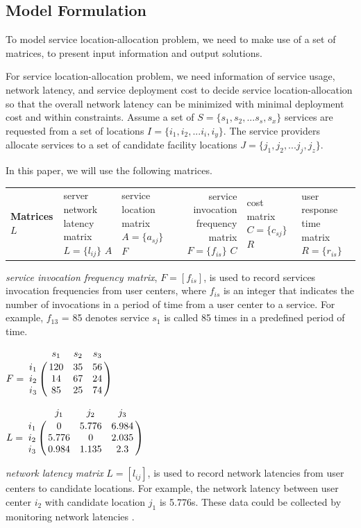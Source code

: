 \documentclass{llncs}
\let\bbordermatrix\bordermatrix
\begin{document}
\subsection{Model Formulation}
\label{sec:model}
To model service location-allocation problem, we need to make use of a set of matrices, to present input information and output solutions. 

For service location-allocation problem, we need information of service usage, network latency, and service deployment cost to decide service location-allocation so that the overall network latency can be minimized with minimal deployment cost and within constraints.
Assume a set of $S = \{ s_{1}, s_{2}, ...s_{s}, s_{x}\}$ services are
requested from a set of locations $I = \{ i_{1}, i_{2}, ...i_{i}, i_{y} \}$. 
The service providers allocate services to a set of candidate facility locations $J = \{ j_{1}, j_{2}, ...j_{j}, j_{z} \}$.


In this paper, we will use the following matrices.
\begin{center}
{
	\begin{tabular}{l*{2}{l}r}
		\hline
		\textbf{Matrices} \cr
		$L$ & server network latency matrix $L = \{l_{ij}\}$ \cr
		$A$ & service location matrix $A = \{a_{sj}\}$ \cr
		$F$ & service invocation frequency matrix $F = \{f_{is}\}$ \cr
		$C$ & cost matrix $C = \{c_{sj}\}$ \cr
		$R$ & user response time matrix $R = \{r_{is}\}$ \cr
		\hline
	\end{tabular}
}
\end{center}
\emph{service invocation frequency matrix}, $F= [f_{is}]$, is used to record services invocation frequencies from user centers, 
where $f_{is}$ is an integer that indicates the number of invocations in a period of time from a user center to a service. 
For example, $f_{13}$ = 85 denotes service $s_{1}$ is called 85 times in a predefined period of time.

\parbox{.45\linewidth}{
{\centering
$
F = \bbordermatrix{~ & s_{1} & s_{2} & s_{3}  \cr
					i_{1}	&120 &35 &56	\cr
					i_{2}	&14  &67 &24 \cr
					i_{3}	&85 &25 &74 \cr}
$
\\}
}
\parbox{.45\linewidth}{
{\centering
$
L = \bbordermatrix{~ & j_{1} & j_{2} & j_{3} \cr
					i_{1}	&0 &5.776 &6.984	\cr
					i_{2}	&5.776  &0 &2.035 \cr
					i_{3}	&0.984 &1.135	&2.3 \cr}
$
\\}
}

\emph{network latency matrix} $L = [l_{ij}]$, is used to record network latencies from user centers to 
candidate locations. For example, the network latency between user center $i_{2}$ with candidate location $j_{1}$ 
is 5.776s. These data could be collected by monitoring network latencies \cite{6076756} \cite{5552800}.
\end{document}
